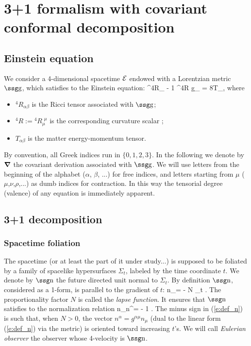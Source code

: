 %
%
\chapter{3+1 formalism with covariant conformal decomposition}

\section{Einstein equation}

We consider a 4-dimensional spacetime $\cal E$ endowed
with a Lorentzian metric $\w{g}$, which satisfies 
to the Einstein equation:
\be \label{e:einstein}
	{}^4\!R_{\alpha\beta} - {1} {}^4\!R g_{\alpha\beta} = 
	8\pi T_{\alpha\beta},
\ee
where
\begin{itemize}
\item ${}^4\!R_{\alpha\beta}$ is the Ricci tensor associated with $\w{g}$;
\item ${}^4\!R := {}^4\!R_\mu^{\ \, \mu}$ is the corresponding curvature scalar ;
\item $T_{\alpha\beta}$ is the matter energy-momentum tensor.
\end{itemize}
By convention, all Greek indices run in $\{0,1,2,3\}$.
In the following we denote by $\mbox{\boldmath ${\nabla}$}$ the covariant 
derivation associated with $\w{g}$. We will use letters from the
beginning of the alphabet ($\alpha$, $\beta$, ...) for free indices,
and letters starting from $\mu$ ($\mu$,$\nu$,$\rho$,...) as dumb indices
for contraction. In this way the tensorial degree (valence) of any 
equation is immediately apparent. 

\section{3+1 decomposition}

\subsection{Spacetime foliation}

The spacetime (or at least the part of it under study...)
is supposed to be foliated by a family of spacelike hypersurfaces $\Sigma_t$,
labeled by the time coordinate $t$.
We denote by $\w{n}$ the future directed unit normal to $\Sigma_t$.
By definition
$\w{n}$, considered as a 1-form, is parallel to the gradient of $t$:
\be \label{e:def_n}
	n_\alpha = - N \nabla_\alpha t . 
\ee
The proportionality factor $N$ is called the {\em lapse function}.
It ensures that $\w{n}$ satisfies to the normalization relation
\be
	n_\mu n^\mu = - 1  . 
\ee
The minus sign in (\ref{e:def_n}) is such that, when $N>0$, the 
vector $n^\alpha = g^{\alpha\mu} n_\mu$ (dual to the linear form 
(\ref{e:def_n}) via the metric) is oriented toward
increasing $t$'s.
We will call {\em Eulerian observer} the
observer whose 4-velocity is $\w{n}$.

